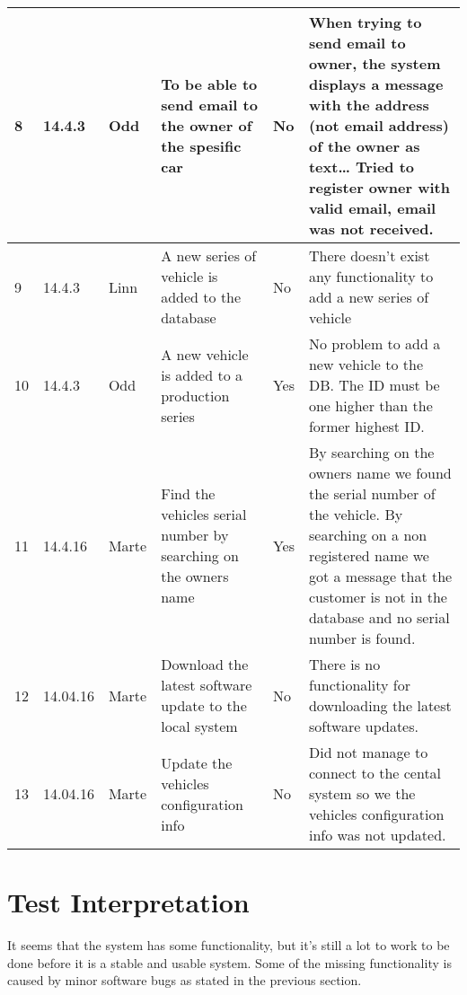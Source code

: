 \begin{center}
\begin{longtable}{| l | l | l | p{3cm}  | l | p{5cm} |}
	    8 
	    & 14.4.3 
	    & Odd 
	    & To be able to send email to the owner of the spesific car 
	    & No 
	    & When trying to send email to owner, the system displays a message with the address 
	    (not email address) of the owner as text… Tried to register owner with valid email, 
	    email was not received. \\ \hline

	    9 
	    & 14.4.3 
	    & Linn 
	    & A new series of vehicle is added to the database 
	    & No & There doesn't exist any functionality to add a new series of vehicle \\ \hline

	    10 
	    & 14.4.3 
	    & Odd 
	    & A new vehicle is added to a production series 
	    & Yes 
	    & No problem to add a new vehicle to the DB. The ID must be one higher than the 
	    former highest ID. \\ \hline

	    11 
	    & 14.4.16 
	    & Marte 
	    & Find the vehicles serial number by searching on the owners name 
	    & Yes 
	    & By searching on the owners name we found the serial number of the vehicle. By searching 
	    on a non registered name we got a message that the customer is not in the database and 
	    no serial number is found. \\ \hline

	    12 
	    & 14.04.16 
	    & Marte 
	    & Download the latest software update to the local system 
	    & No 
	    & There is no functionality for downloading the latest software updates. \\ \hline

	    13 
	    & 14.04.16 
	    & Marte 
	    & Update the vehicles configuration info 
	    & No 
	    & Did not manage to connect to the cental system so we the vehicles configuration 
	    info was not updated. \\ \hline 

	    \hline
	    \end{longtable}
	\end{center}

	\section{Test Interpretation}

		It seems that the system has some functionality, but it’s still a lot to work to be 
		done before it is a stable and usable system. Some of the missing functionality is 
		caused by minor software bugs as stated in the previous section.

